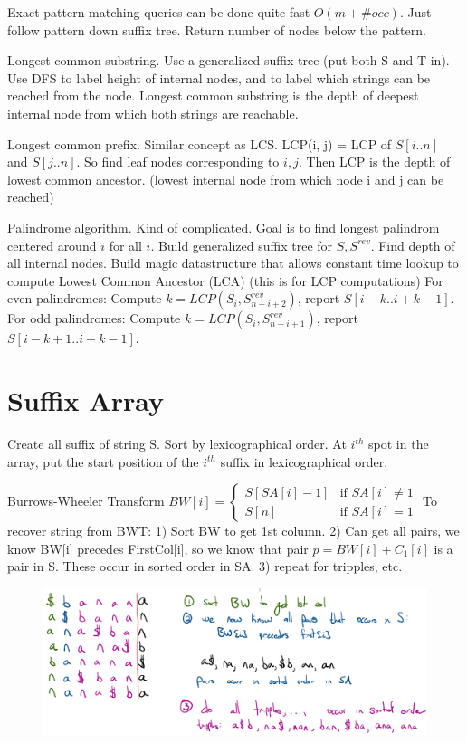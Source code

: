 \documentclass[10pt]{article}
\begin{document}
Exact pattern matching queries can be done quite fast $O(m + \# occ)$.
Just follow pattern down suffix tree. Return number of nodes below the pattern.

Longest common substring. Use a generalized suffix tree (put both S and T in).
Use DFS to label height of internal nodes, and to label which strings can be reached from the node.
Longest common substring is the depth of deepest internal node from which both strings are reachable. 

Longest common prefix. Similar concept as LCS. LCP(i, j) = LCP of $S[i .. n]$ and $S[j .. n]$.
So find leaf nodes corresponding to $i, j$. Then LCP is the depth of lowest common ancestor.
(lowest internal node from which node i and j can be reached)

Palindrome algorithm. Kind of complicated. Goal is to find longest palindrom centered around $i$ for all $i$.
Build generalized suffix tree for $S, S^{rev}$. Find depth of all internal nodes.
Build magic datastructure that allows constant time lookup to compute Lowest Common Ancestor (LCA) (this is for LCP computations)
For even palindromes: Compute $k = LCP(S_i, S^{rev}_{n-i+2})$, report $S[i-k .. i + k - 1]$. 
For odd palindromes: Compute $k = LCP(S_i, S^{rev}_{n-i+1})$, report $S[i-k + 1 .. i + k - 1]$. 

\section{Suffix Array}
Create all suffix of string S. Sort by lexicographical order.
At $i^{th}$ spot in the array, put the start position of the $i^{th}$ suffix in lexicographical order. 

Burrows-Wheeler Transform $BW[i] = \begin{cases}
    S[SA[i] - 1] & \text{if } SA[i] \neq 1\\
    S[n] & \text{if } SA[i] = 1
\end{cases}$
To recover string from BWT: 1) Sort BW to get 1st column.
 2) Can get all pairs, we know BW[i] precedes FirstCol[i],
 so we know that pair $p = BW[i] + C_1[i]$ is a pair in S. These occur in sorted order in SA.
 3) repeat for tripples, etc.

 \begin{figure}[H] 
    \centering
    \includegraphics[width=\linewidth]{BWT.png}
\end{figure}
\end{document}
